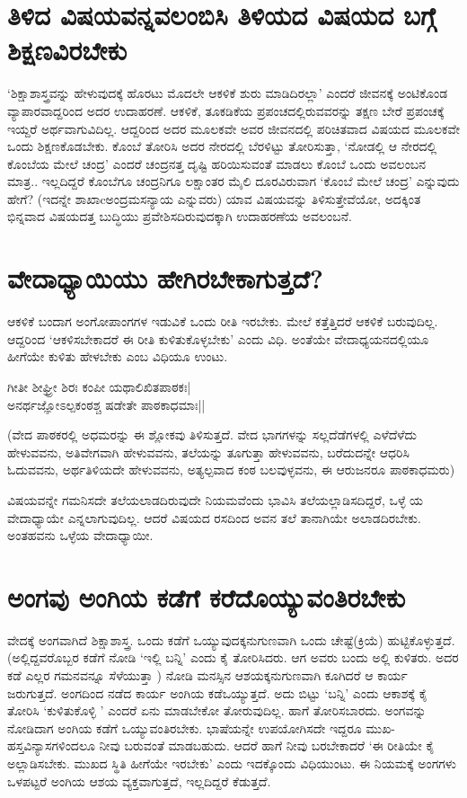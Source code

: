 \section*{ತಿಳಿದ ವಿಷಯವನ್ನವಲಂಬಿಸಿ ತಿಳಿಯದ ವಿಷಯದ ಬಗ್ಗೆ  ಶಿಕ್ಷಣವಿರಬೇಕು}

`ಶಿಕ್ಷಾಶಾಸ್ತ್ರವನ್ನು  ಹೇಳುವುದಕ್ಕೆ  ಹೊರಟು ಮೊದಲೇ ಆಕಳಿಕೆ  ಶುರು ಮಾಡಿದಿರಲ್ಲಾ' ಎಂದರೆ ಜೀವನಕ್ಕೆ  ಅಂಟಿಕೊಂಡ ವ್ಯಾಪಾರವಾದ್ದರಿಂದ ಅದರ ಉದಾಹರಣೆ. ಆಕಳಿಕೆ, ತೂಕಡಿಕೆಯ ಪ್ರಪಂಚದಲ್ಲಿರುವವರನ್ನು  ತಕ್ಷಣ  ಬೇರೆ  ಪ್ರಪಂಚಕ್ಕೆ   ಇಯ್ದರೆ ಅರ್ಥವಾಗುವಿದಿಲ್ಲ. ಆದ್ದರಿಂದ ಅದರ ಮೂಲಕವೇ ಅವರ ಜೀವನದಲ್ಲಿ ಪರಿಚಿತವಾದ ವಿಷಯದ ಮೂಲಕವೇ ಒಂದು ಶಿಕ್ಷಣಕೊಡಬೇಕು. ಕೊಂಬೆ ತೋರಿಸಿ ಅದರ ನೇರದಲ್ಲಿ ಬೆರಳಿಟ್ಟು  ತೋರಿಸುತ್ತಾ, `ನೋಡಲ್ಲಿ ಆ ನೇರದಲ್ಲಿ  ಕೊಂಬೆಯ ಮೇಲೆ ಚಂದ್ರ' ಎಂದರೆ  ಚಂದ್ರನತ್ತ  ದೃಷ್ಟಿ  ಹರಿಯಿಸುವಂತೆ  ಮಾಡಲು ಕೊಂಬೆ ಒಂದು ಅವಲಂಬನ ಮಾತ್ರ..  ಇಲ್ಲದಿದ್ದರೆ ಕೊಂಬೆಗೂ ಚಂದ್ರನಿಗೂ ಲಕ್ಷಾಂತರ ಮೈಲಿ ದೂರವಿರುವಾಗ `ಕೊಂಬೆ ಮೇಲೆ ಚಂದ್ರ' ಎನ್ನುವುದು ಹೇಗೆ? (ಇದನ್ನೇ ಶಾಖಾcಅಂದ್ರಮಸನ್ಯಾಯ  ಎನ್ನುವರು) ಯಾವ ವಿಷಯವನ್ನು ತಿಳಿಸುತ್ತೇವೆಯೋ, ಅದಕ್ಕಿಂತ  ಭಿನ್ನವಾದ ವಿಷಯದತ್ತ  ಬುದ್ಧಿಯು ಪ್ರವೇಶಿಸದಿರುವುದಕ್ಕಾಗಿ ಉದಾಹರಣೆಯ ಅವಲಂಬನೆ. 

\section*{ವೇದಾಧ್ಯಾಯಿಯು ಹೇಗಿರಬೇಕಾಗುತ್ತದೆ?}

ಆಕಳಿಕೆ ಬಂದಾಗ ಅಂಗೋಪಾಂಗಗಳ ಇಡುವಿಕೆ  ಒಂದು ರೀತಿ ಇರಬೇಕು. ಮೇಲೆ ಕತ್ತೆತ್ತಿದರೆ ಆಕಳಿಕೆ ಬರುವುದಿಲ್ಲ. ಆದ್ದರಿಂದ `ಆಕಳಿಸಬೇಕಾದರೆ ಈ ರೀತಿ ಕುಳಿತುಕೊಳ್ಳಬೇಕು' ಎಂದು ವಿಧಿ. ಅಂತೆಯೇ ವೇದಾಧ್ಯಯನದಲ್ಲಿಯೂ ಹೀಗೆಯೇ ಕುಳಿತು ಹೇಳಬೇಕು ಎಂಬ ವಿಧಿಯೂ ಉಂಟು.

\begin{shloka}
ಗೀತೀ ಶೀಘ್ರ್ರೀ ಶಿರಃ ಕಂಪೀ ಯಥಾಲಿಖಿತಪಾಠಕಃ|\\
ಅನರ್ಥಜ್ಞೋಽಲ್ಪಕಂಠಶ್ಚ ಷಡೇತೇ ಪಾಠಕಾಧಮಾಃ||
\end{shloka}

(ವೇದ ಪಾಠಕರಲ್ಲಿ ಅಧಮರನ್ನು  ಈ ಶ್ಲೋಕವು ತಿಳಿಸುತ್ತದೆ. ವೇದ ಭಾಗಗಳನ್ನು  ಸಲ್ಲದೆಡೆಗಳಲ್ಲಿ  ಎಳೆದೆಳೆದು ಹೇಳುವವನು, ಅತಿವೇಗವಾಗಿ ಹೇಳುವವನು, ತಲೆಯನ್ನು  ತೂಗುತ್ತಾ ಹೇಳುವವನು, ಬರೆದುದನ್ನೇ ಆಧರಿಸಿ ಓದುವವನು, ಅರ್ಥತಿಳಿಯದೇ ಹೇಳುವವನು, ಅತ್ಯಲ್ಪವಾದ ಕಂಠ ಬಲವುಳ್ಳವನು, ಈ ಆರುಜನರೂ ಪಾಠಕಾಧಮರು)

ವಿಷಯವನ್ನೇ ಗಮನಿಸದೇ ತಲೆಯಲಾಡದಿರುವುದೇ ನಿಯಮವೆಂದು ಭಾವಿಸಿ ತಲೆಯಲ್ಲಾಡಿಸದಿದ್ದರೆ, ಒಳ್ಳೆ ಯ ವೇದಾಧ್ಯಾಯೇ ಎನ್ನಲಾಗುವುದಿಲ್ಲ. ಆದರೆ ವಿಷಯದ ರಸದಿಂದ ಅವನ ತಲೆ ತಾನಾಗಿಯೇ ಅಲಾಡದಿರಬೇಕು. ಅಂತಹವನು ಒಳ್ಳೆಯ ವೇದಾಧ್ಯಾಯೀ.

\section*{ಅಂಗವು ಅಂಗಿಯ ಕಡೆಗೆ ಕರೆದೊಯ್ಯುವಂತಿರಬೇಕು}

ವೇದಕ್ಕೆ  ಅಂಗವಾಗಿದೆ ಶಿಕ್ಷಾಶಾಸ್ತ್ರ. ಒಂದು ಕಡೆಗೆ ಒಯ್ಯುವುದಕ್ಕನುಗುಣವಾಗಿ ಒಂದು ಚೇಷ್ಟೆ(ಕ್ರಿಯೆ) ಹುಟ್ಟಿಕೊಳ್ಳುತ್ತದೆ. (ಅಲ್ಲಿದ್ದವರೊಬ್ಬರ ಕಡೆಗೆ ನೋಡಿ `ಇಲ್ಲಿ ಬನ್ನಿ' ಎಂದು ಕೈ ತೋರಿಸಿದರು. ಆಗ ಅವರು ಬಂದು ಅಲ್ಲಿ ಕುಳಿತರು. ಅದರ ಕಡೆ ಎಲ್ಲರ ಗಮನವನ್ನೂ  ಸೆಳೆಯುತ್ತಾ ) ನೋಡಿ ಮನಸ್ಸಿನ ಆಶಯಕ್ಕನುಗುಣವಾಗಿ ಕೂಗಿದರೆ ಆ ಕಾರ್ಯ ಜರುಗುತ್ತದೆ. ಅಂಗದಿಂದ ನಡೆದ ಕಾರ್ಯ ಅಂಗಿಯ ಕಡೆಒಯ್ಯುತ್ತದೆ. ಅದು ಬಿಟ್ಟು  `ಬನ್ನಿ' ಎಂದು  ಆಕಾಶಕ್ಕೆ  ಕೈ ತೋರಿಸಿ  `ಕುಳಿತುಕೊಳ್ಳಿ ' ಎಂದರೆ  ಏನು ಮಾಡಬೇಕೋ ತೋರುವುದಿಲ್ಲ. ಹಾಗೆ ತೋರಿಸಬಾರದು. ಅಂಗವನ್ನು  ನೋಡಿದಾಗ ಅಂಗಿಯ ಕಡೆಗೆ ಒಯ್ಯುವಂತಿರಬೇಕು. ಭಾಷೆಯನ್ನೇ ಉಪಯೋಗಿಸದೇ ಇದ್ದರೂ ಮುಖ-ಹಸ್ತವಿನ್ಯಾಸಗಳಿಂದಲೂ  ನೀವು ಬರುವಂತೆ ಮಾಡಬಹುದು. ಆದರೆ  ಹಾಗೆ ನೀವು ಬರಬೇಕಾದರೆ `ಈ ರೀತಿಯೇ ಕೈ ಅಲ್ಲಾಡಿಸಬೇಕು. ಮುಖದ ಸ್ಥಿತಿ  ಹೀಗೆಯೇ  ಇರಬೇಕು' ಎಂದು ಇದಕ್ಕೊಂದು ವಿಧಿಯುಂಟು. ಈ ನಿಯಮಕ್ಕೆ  ಅಂಗಗಳು ಒಳಪಟ್ಟರೆ ಅಂಗಿಯ ಆಶಯ ವ್ಯಕ್ತವಾಗುತ್ತದೆ, ಇಲ್ಲದಿದ್ದರೆ ಕೆಡುತ್ತದೆ.

